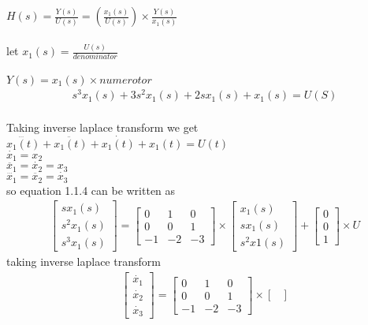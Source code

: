 \begin{enumerate}[label=\thesection.\arabic*.,ref=\thesection.\theenumi]
\\
\\ $H(s)=\frac{Y(s)}{U(s)}=(\frac{x_{1}(s)}{U(s)})\times \frac{Y(s)}{x_{1}(s)}$
\\
\\let   $x_{1}(s)=\frac{U(s)}{denominator}$
\\
\\$Y(s)=x_{1}(s)\times numerotor$
\begin{align}
s^3x_{1}(s)+3s^2x_{1}(s)+2sx_{1}(s)+x_{1}(s)=U(S)
\end{align}
\\ Taking inverse laplace transform we get
\\$\dddot{x_{1}(t)}+\ddot{x_{1}(t)}+\dot{x_{1}(t)}+x_{1}(t)=U(t)$
\\$\dot{x_{1}}=x_{2}$
\\$\ddot{x_{1}}=\dot{x_{2}}=x_{3}$
\\$\dddot{x_{1}}=\ddot{x_{2}}=\dot{x_{3}}$
\\ so equation 1.1.4 can be written as
\\
\begin{gather}
\begin{bmatrix}
sx_{1}(s)\\
s^2x_{1}(s)\\
s^3x_{1}(s)
\end{bmatrix}
=
\begin{bmatrix}
0&1&0\\
0&0&1\\
-1&-2&-3
\end{bmatrix}\times \begin{bmatrix}
x_{1}(s)\\
sx_{1}(s)\\
s^2x{1}(s)
\end{bmatrix}
+
\begin{bmatrix}
0\\
0\\
1
\end{bmatrix} \times U
\end{gather}
taking inverse laplace transform
\begin{gather}
\begin{bmatrix}
\dot{x_{1}}\\
\dot{x_{2}}\\
\dot{x_{3}}
\end{bmatrix}
=
\begin{bmatrix}
0&1&0\\
0&0&1\\
-1&-2&-3
\end{bmatrix}\times \begin{bmatrix}

\end{bmatrix}
\end{gather}
\end{enumerate}
